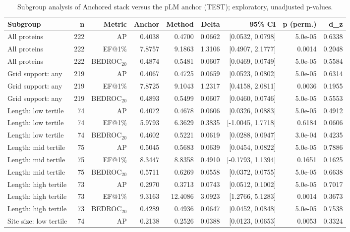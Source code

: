\begin{table}[t]
\centering
\small
\caption{Subgroup analysis of Anchored stack versus the pLM anchor (TEST); exploratory, unadjusted p-values.}
\label{tab:table5_subgroups_test}
\begin{tabular}{lrrrrrrrr}
\toprule
Subgroup & n & Metric & Anchor & Method & Delta & 95\% CI & p (perm.) & d\_z \\
\midrule
All proteins & 222 & AP & 0.4038 & 0.4700 & 0.0662 & [0.0532, 0.0798] & 5.0e-05 & 0.6338 \\
All proteins & 222 & EF@1\% & 7.8757 & 9.1863 & 1.3106 & [0.4907, 2.1777] & 0.0014 & 0.2048 \\
All proteins & 222 & BEDROC$_{20}$ & 0.4874 & 0.5481 & 0.0607 & [0.0469, 0.0749] & 5.0e-05 & 0.5584 \\
Grid support: any & 219 & AP & 0.4067 & 0.4725 & 0.0659 & [0.0523, 0.0802] & 5.0e-05 & 0.6314 \\
Grid support: any & 219 & EF@1\% & 7.8725 & 9.1043 & 1.2317 & [0.4158, 2.0811] & 0.0036 & 0.1955 \\
Grid support: any & 219 & BEDROC$_{20}$ & 0.4893 & 0.5499 & 0.0607 & [0.0460, 0.0746] & 5.0e-05 & 0.5553 \\
Length: low tertile & 74 & AP & 0.4072 & 0.4678 & 0.0606 & [0.0326, 0.0883] & 5.0e-05 & 0.4912 \\
Length: low tertile & 74 & EF@1\% & 5.9793 & 6.3629 & 0.3835 & [-1.0045, 1.7718] & 0.6184 & 0.0606 \\
Length: low tertile & 74 & BEDROC$_{20}$ & 0.4602 & 0.5221 & 0.0619 & [0.0288, 0.0947] & 3.0e-04 & 0.4235 \\
Length: mid tertile & 75 & AP & 0.5045 & 0.5683 & 0.0639 & [0.0454, 0.0822] & 5.0e-05 & 0.7886 \\
Length: mid tertile & 75 & EF@1\% & 8.3447 & 8.8358 & 0.4910 & [-0.1793, 1.1394] & 0.1651 & 0.1625 \\
Length: mid tertile & 75 & BEDROC$_{20}$ & 0.5711 & 0.6269 & 0.0558 & [0.0372, 0.0755] & 5.0e-05 & 0.6638 \\
Length: high tertile & 73 & AP & 0.2970 & 0.3713 & 0.0743 & [0.0512, 0.1002] & 5.0e-05 & 0.7017 \\
Length: high tertile & 73 & EF@1\% & 9.3163 & 12.4086 & 3.0923 & [1.2766, 5.1283] & 0.0014 & 0.3673 \\
Length: high tertile & 73 & BEDROC$_{20}$ & 0.4289 & 0.4936 & 0.0647 & [0.0452, 0.0848] & 5.0e-05 & 0.7538 \\
Site size: low tertile & 74 & AP & 0.2138 & 0.2526 & 0.0388 & [0.0123, 0.0653] & 0.0053 & 0.3324 \\

\end{tabular}
\end{table}
